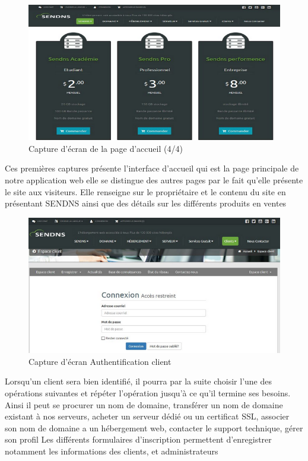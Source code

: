 \documentclass[a4paper, 12pt]{report}
\begin{document}
\begin{figure}[H]
	\centering
	\includegraphics{img/solution/4}
	\caption{Capture d'écran de la page d'accueil (4/4)}
	\label{Tux}
\end{figure}
\noindent Ces premières captures présente l'interface d’accueil qui est la page principale de notre application web elle se distingue des autres pages par le fait qu'elle présente le site aux visiteurs. Elle renseigne sur le propriétaire et le contenu du site en présentant SENDNS ainsi que des détails sur les différents produits en ventes 
\begin{figure}[H]
	\centering
	\includegraphics{img/solution/5}
	\caption{Capture d'écran Authentification client}
	\label{Tux}
\end{figure}
\noindent Lorsqu’un client sera bien identifié, il pourra par la suite choisir l’une des opérations suivantes et répéter l’opération jusqu’à ce qu’il termine ses besoins. Ainsi il peut se procurer un nom de domaine, transférer un nom de domaine existant à nos serveurs, acheter un serveur dédié ou un certificat SSL, associer son nom de domaine a un hébergement web, contacter le support technique, gérer son profil
Les différents formulaires d’inscription permettent d’enregistrer notamment les informations des clients, et administrateurs
\end{document}
